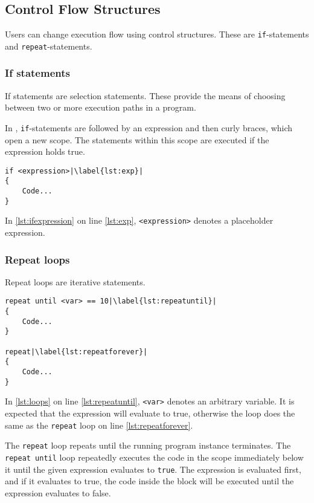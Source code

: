 \subsection{Control Flow Structures}
Users can change execution flow using control structures. These are \texttt{if}-statements and \texttt{repeat}-statements.
\subsubsection{If statements}
If statements are selection statements. These provide the means of choosing between two or more execution paths in a program\cite{sebesta_concepts_2016}.

In \dazel{}, \texttt{if}-statements are followed by an expression and then curly braces, which open a new scope. The statements within this scope are executed if the expression holds true.

\begin{lstlisting}[language=CSharp, caption={Example of an if statement}, label={lst:ifexpression},escapechar=|]
if <expression>|\label{lst:exp}|
{
    Code...
}
\end{lstlisting}

In \ref{lst:ifexpression} on line \ref{lst:exp},  \verb|<expression>| denotes a placeholder expression.

\subsubsection{Repeat loops}
Repeat loops are iterative statements.

\begin{lstlisting}[caption={Example of loops}, label={lst:loops},escapechar=|]
repeat until <var> == 10|\label{lst:repeatuntil}|
{
    Code...
}

repeat|\label{lst:repeatforever}|
{
    Code...
}
\end{lstlisting}

In \ref{lst:loops} on line \ref{lst:repeatuntil}, \verb|<var>| denotes an arbitrary variable. It is expected that the expression will evaluate to true, otherwise the loop does the same as the \verb|repeat| loop on line \ref{lst:repeatforever}.

The \verb|repeat| loop repeats until the running program instance terminates.
The \verb|repeat until| loop repeatedly executes the code in the scope immediately below it until the given expression evaluates to \verb|true|.
The expression is evaluated first, and if it evaluates to true, the code inside the block will be executed until the expression evaluates to false.
